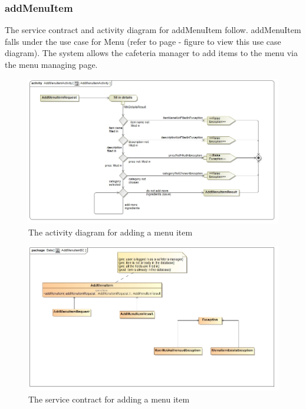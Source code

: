 \documentclass[a4paper,12pt]{report}
\begin{document}
 \subsubsection{addMenuItem}
The service contract and activity diagram for addMenuItem follow. addMenuItem falls under the use case for Menu (refer to page   - figure   to view this use case diagram). The system allows the cafeteria manager to add items to the menu via the menu managing page.
\begin{figure}[H]
  \centering
    \includegraphics[width=1.0\textwidth]{../images/AddMenuItemActivity.jpg}
    \caption{The activity diagram for adding a menu item } 
\end{figure}
\begin{figure}[H]
	\centering
	\includegraphics[width=1.0\textwidth]{../images/AddMenuItemSC.jpg}
	\caption{The service contract for adding a menu item}
\end{figure}
\end{document}
